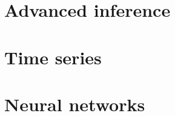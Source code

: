 \documentclass{book}
\begin{document}
\part{Advanced inference}






\part{Time series}





\part{Neural networks}



\end{document}
